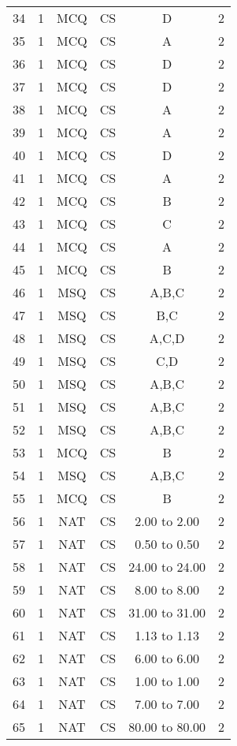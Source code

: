 \begin{table}[h!]
\begin{tabular}{|c|c|c|c|c|c|}
34 & 1 & MCQ & CS & D & 2 \\
35 & 1 & MCQ & CS & A & 2 \\
36 & 1 & MCQ & CS & D & 2 \\
37 & 1 & MCQ & CS & D & 2 \\
38 & 1 & MCQ & CS & A & 2 \\
39 & 1 & MCQ & CS & A & 2 \\
40 & 1 & MCQ & CS & D & 2 \\
41 & 1 & MCQ & CS & A & 2 \\
42 & 1 & MCQ & CS & B & 2 \\
43 & 1 & MCQ & CS & C & 2 \\
44 & 1 & MCQ & CS & A & 2 \\
45 & 1 & MCQ & CS & B & 2 \\
46 & 1 & MSQ & CS & A,B,C & 2 \\
47 & 1 & MSQ & CS & B,C & 2 \\
48 & 1 & MSQ & CS & A,C,D & 2 \\
49 & 1 & MSQ & CS & C,D & 2 \\
50 & 1 & MSQ & CS & A,B,C & 2 \\
51 & 1 & MSQ & CS & A,B,C & 2 \\
52 & 1 & MSQ & CS & A,B,C & 2 \\
53 & 1 & MCQ & CS & B & 2 \\
54 & 1 & MSQ & CS & A,B,C & 2 \\
55 & 1 & MCQ & CS & B & 2 \\
56 & 1 & NAT & CS & 2.00 to 2.00 & 2 \\
57 & 1 & NAT & CS & 0.50 to 0.50 & 2 \\
58 & 1 & NAT & CS & 24.00 to 24.00 & 2 \\
59 & 1 & NAT & CS & 8.00 to 8.00 & 2 \\
60 & 1 & NAT & CS & 31.00 to 31.00 & 2 \\
61 & 1 & NAT & CS & 1.13 to 1.13 & 2 \\
62 & 1 & NAT & CS & 6.00 to 6.00 & 2 \\
63 & 1 & NAT & CS & 1.00 to 1.00 & 2 \\
64 & 1 & NAT & CS & 7.00 to 7.00 & 2 \\
65 & 1 & NAT & CS & 80.00 to 80.00 & 2 \\
\hline
\end{tabular}
\caption*{}
\label{tab:answerkey}
\end{table}
